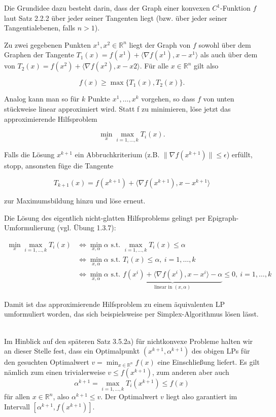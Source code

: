 \documentclass[12pt]{extreport} %
\newcommand{\R}{\mathbb{R}}
\theoremstyle{named}
\theoremstyle{nnamed}
\theoremstyle{itshape}
\theoremstyle{normal}
\begin{document}
Die Grundidee dazu besteht darin, dass der Graph einer konvexen $C^1$-Funktion $f$ laut Satz 2.2.2 über jeder seiner Tangenten liegt (bzw. über jeder seiner Tangentialebenen, falls $n > 1$). ~\bigskip

Zu zwei gegebenen Punkten $x^1, x^2 \in \R^n$ liegt der Graph von $f$ sowohl über dem Graphen der Tangente $T_1 (x) = f(x^1) + \langle \nabla f(x^1), x - x^1 \rangle$ als auch über dem von $T_2 (x) = f(x^2) + \langle \nabla f(x^2), x - x2 \rangle$. Für alle $x \in \R^n$ gilt also

		$$ f(x) \geq \max \big\{ T_1(x), T_2(x) \big\} . $$

Analog kann man so für $k$ Punkte $x^1, \dotsc, x^k$ vorgehen, so dass $f$ von unten stückweise linear approximiert wird. Statt f zu minimieren, löse jetzt das approximierende Hilfsproblem

		$$ \min_x \max_{i = 1, \dotsc, k} T_i(x). $$
		
Falls die Lösung $x^{k+1}$ ein Abbruchkriterium (z.B. $\| \nabla f(x^{k+1})\| \leq \epsilon$) erfüllt, stopp, ansonsten füge die Tangente

	$$ T_{k+1}(x) = f(x^{k+1}) + \langle \nabla f(x^{k+1}), x -x^{k+1} \rangle $$

zur Maximumsbildung hinzu und löse erneut. ~\bigskip

Die Lösung des eigentlich nicht-glatten Hilfsproblems gelingt per Epigraph-Umformulierung (vgl. Übung 1.3.7):

	\begin{align*}
		\min_x \max_{i=1, \dotsc, k} T_i(x) & \iff \min_{x, \alpha} \alpha \text{ s.t. } \max_{i=1, \dotsc, k} T_i(x) \leq \alpha \\
		& \iff \min_{x, \alpha} \alpha \text{ s.t. } T_i(x) \leq \alpha, ~i=1, \dotsc, k \\
		& \iff \min_{x, \alpha} \alpha \text{ s.t. } \underbrace{f(x^i) + \langle \nabla f(x^i), x - x^i \rangle - \alpha}_{\text{linear in } (x, \alpha)} \leq 0, ~i = 1, \dotsc, k
	\end{align*}

Damit ist das approximierende Hilfsproblem zu einem äquivalenten LP umformuliert worden, das sich beispielsweise per Simplex-Algorithmus lösen lässt. ~\bigskip

Im Hinblick auf den späteren Satz 3.5.2a) für nichtkonvexe Probleme halten wir an dieser Stelle fest, dass ein Optimalpunkt $(x^{k+1}, \alpha^{k+1})$ des obigen LPs für den gesuchten Optimalwert $v = \min_{x \in \R^n} f(x)$ eine Einschließung liefert. Es gilt nämlich zum einen trivialerweise $v \leq f(x^{k+1})$, zum anderen aber auch
	$$ \alpha^{k+1} = \max_{i=1, \dotsc, k} T_i(x^{k+1}) \leq f(x) $$
für allen $x \in \R^n$, also $\alpha^{k+1} \leq v$. Der Optimalwert $v$ liegt also garantiert im Intervall $[\alpha^{k+1}, f(x^{k+1})]$.


\end{document}
